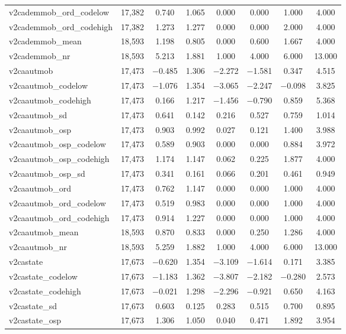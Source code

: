 \begin{table}[!htbp]
\begin{tabular}{@{\extracolsep{5pt}}lccccccc}
v2cademmob\_ord\_codelow & 17,382 & 0.740 & 1.065 & 0.000 & 0.000 & 1.000 & 4.000 \\ 
v2cademmob\_ord\_codehigh & 17,382 & 1.273 & 1.277 & 0.000 & 0.000 & 2.000 & 4.000 \\ 
v2cademmob\_mean & 18,593 & 1.198 & 0.805 & 0.000 & 0.600 & 1.667 & 4.000 \\ 
v2cademmob\_nr & 18,593 & 5.213 & 1.881 & 1.000 & 4.000 & 6.000 & 13.000 \\ 
v2caautmob & 17,473 & $-$0.485 & 1.306 & $-$2.272 & $-$1.581 & 0.347 & 4.515 \\ 
v2caautmob\_codelow & 17,473 & $-$1.076 & 1.354 & $-$3.065 & $-$2.247 & $-$0.098 & 3.825 \\ 
v2caautmob\_codehigh & 17,473 & 0.166 & 1.217 & $-$1.456 & $-$0.790 & 0.859 & 5.368 \\ 
v2caautmob\_sd & 17,473 & 0.641 & 0.142 & 0.216 & 0.527 & 0.759 & 1.014 \\ 
v2caautmob\_osp & 17,473 & 0.903 & 0.992 & 0.027 & 0.121 & 1.400 & 3.988 \\ 
v2caautmob\_osp\_codelow & 17,473 & 0.589 & 0.903 & 0.000 & 0.000 & 0.884 & 3.972 \\ 
v2caautmob\_osp\_codehigh & 17,473 & 1.174 & 1.147 & 0.062 & 0.225 & 1.877 & 4.000 \\ 
v2caautmob\_osp\_sd & 17,473 & 0.341 & 0.161 & 0.066 & 0.201 & 0.461 & 0.949 \\ 
v2caautmob\_ord & 17,473 & 0.762 & 1.147 & 0.000 & 0.000 & 1.000 & 4.000 \\ 
v2caautmob\_ord\_codelow & 17,473 & 0.519 & 0.983 & 0.000 & 0.000 & 1.000 & 4.000 \\ 
v2caautmob\_ord\_codehigh & 17,473 & 0.914 & 1.227 & 0.000 & 0.000 & 1.000 & 4.000 \\ 
v2caautmob\_mean & 18,593 & 0.870 & 0.833 & 0.000 & 0.250 & 1.286 & 4.000 \\ 
v2caautmob\_nr & 18,593 & 5.259 & 1.882 & 1.000 & 4.000 & 6.000 & 13.000 \\ 
v2castate & 17,673 & $-$0.620 & 1.354 & $-$3.109 & $-$1.614 & 0.171 & 3.385 \\ 
v2castate\_codelow & 17,673 & $-$1.183 & 1.362 & $-$3.807 & $-$2.182 & $-$0.280 & 2.573 \\ 
v2castate\_codehigh & 17,673 & $-$0.021 & 1.298 & $-$2.296 & $-$0.921 & 0.650 & 4.163 \\ 
v2castate\_sd & 17,673 & 0.603 & 0.125 & 0.283 & 0.515 & 0.700 & 0.895 \\ 
v2castate\_osp & 17,673 & 1.306 & 1.050 & 0.040 & 0.471 & 1.892 & 3.954 \\ 

\end{tabular}
\end{table}
